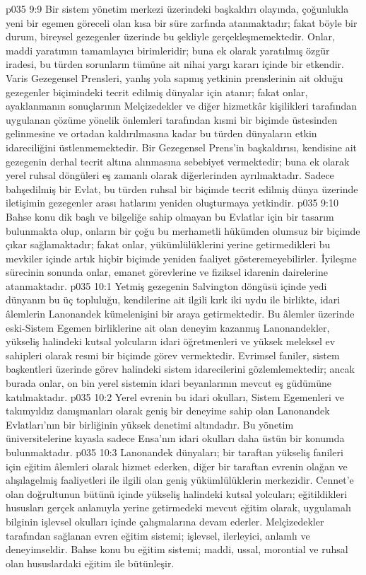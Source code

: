 \vs p035 9:9 Bir sistem yönetim merkezi üzerindeki başkaldırı olayında, çoğunlukla yeni bir egemen göreceli olan kısa bir süre zarfında atanmaktadır; fakat böyle bir durum, bireysel gezegenler üzerinde bu şekliyle gerçekleşmemektedir. Onlar, maddi yaratımın tamamlayıcı birimleridir; buna ek olarak yaratılmış özgür iradesi, bu türden sorunların tümüne ait nihai yargı kararı içinde bir etkendir. Varis Gezegensel Prensleri, yanlış yola sapmış yetkinin prenslerinin ait olduğu gezegenler biçimindeki tecrit edilmiş dünyalar için atanır; fakat onlar, ayaklanmanın sonuçlarının Melçizedekler ve diğer hizmetkâr kişilikleri tarafından uygulanan çözüme yönelik önlemleri tarafından kısmi bir biçimde üstesinden gelinmesine ve ortadan kaldırılmasına kadar bu türden dünyaların etkin idareciliğini üstlenmemektedir. Bir Gezegensel Prens’in başkaldırısı, kendisine ait gezegenin derhal tecrit altına alınmasına sebebiyet vermektedir; buna ek olarak yerel ruhsal döngüleri eş zamanlı olarak diğerlerinden ayrılmaktadır. Sadece bahşedilmiş bir Evlat, bu türden ruhsal bir biçimde tecrit edilmiş dünya üzerinde iletişimin gezegenler arası hatlarını yeniden oluşturmaya yetkindir.
\vs p035 9:10 Bahse konu dik başlı ve bilgeliğe sahip olmayan bu Evlatlar için bir tasarım bulunmakta olup, onların bir çoğu bu merhametli hükümden olumsuz bir biçimde çıkar sağlamaktadır; fakat onlar, yükümlülüklerini yerine getirmedikleri bu mevkiler içinde artık hiçbir biçimde yeniden faaliyet gösteremeyebilirler. İyileşme sürecinin sonunda onlar, emanet görevlerine ve fiziksel idarenin dairelerine atanmaktadır.
\vs p035 10:1 Yetmiş gezegenin Salvington döngüsü içinde yedi dünyanın bu üç topluluğu, kendilerine ait ilgili kırk iki uydu ile birlikte, idari âlemlerin Lanonandek kümelenişini bir araya getirmektedir. Bu âlemler üzerinde eski\hyp{}Sistem Egemen birliklerine ait olan deneyim kazanmış Lanonandekler, yükseliş halindeki kutsal yolcuların idari öğretmenleri ve yüksek meleksel ev sahipleri olarak resmi bir biçimde görev vermektedir. Evrimsel faniler, sistem başkentleri üzerinde görev halindeki sistem idarecilerini gözlemlemektedir; ancak burada onlar, on bin yerel sistemin idari beyanlarının mevcut eş güdümüne katılmaktadır.
\vs p035 10:2 Yerel evrenin bu idari okulları, Sistem Egemenleri ve takımyıldız danışmanları olarak geniş bir deneyime sahip olan Lanonandek Evlatları’nın bir birliğinin yüksek denetimi altındadır. Bu yönetim üniversitelerine kıyasla sadece Ensa’nın idari okulları daha üstün bir konumda bulunmaktadır.
\vs p035 10:3 Lanonandek dünyaları; bir taraftan yükseliş fanileri için eğitim âlemleri olarak hizmet ederken, diğer bir taraftan evrenin olağan ve alışılagelmiş faaliyetleri ile ilgili olan geniş yükümlülüklerin merkezidir. Cennet’e olan doğrultunun bütünü içinde yükseliş halindeki kutsal yolcuları; eğitildikleri hususları gerçek anlamıyla yerine getirmedeki mevcut eğitim olarak, uygulamalı bilginin işlevsel okulları içinde çalışmalarına devam ederler. Melçizedekler tarafından sağlanan evren eğitim sistemi; işlevsel, ilerleyici, anlamlı ve deneyimseldir. Bahse konu bu eğitim sistemi; maddi, ussal, morontial ve ruhsal olan hususlardaki eğitim ile bütünleşir.
